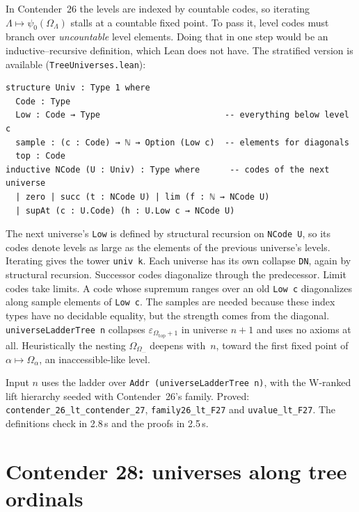 \documentclass[11pt]{article}
\theoremstyle{definition}
\theoremstyle{remark}
\newcommand{\lean}[1]{\texttt{#1}}
\begin{document}
In Contender~26 the levels are indexed by countable codes, so iterating
$\Lambda\mapsto\psi_0(\Omega_\Lambda)$ stalls at a countable fixed point. To
pass it, level codes must branch over \emph{uncountable} level elements. Doing
that in one step would be an inductive--recursive definition, which Lean does
not have. The stratified version is available (\lean{TreeUniverses.lean}):
\begin{lstlisting}
structure Univ : Type 1 where
  Code : Type
  Low : Code → Type                         -- everything below level c
  sample : (c : Code) → ℕ → Option (Low c)  -- elements for diagonals
  top : Code
inductive NCode (U : Univ) : Type where      -- codes of the next universe
  | zero | succ (t : NCode U) | lim (f : ℕ → NCode U)
  | supAt (c : U.Code) (h : U.Low c → NCode U)
\end{lstlisting}
The next universe's \lean{Low} is defined by structural recursion on
\lean{NCode U}, so its codes denote levels as large as the elements of the
previous universe's levels. Iterating gives the tower \lean{univ k}. Each
universe has its own collapse \lean{DN}, again by structural recursion.
Successor codes diagonalize through the predecessor. Limit codes take limits.
A code whose supremum ranges over an old \lean{Low c} diagonalizes along sample
elements of \lean{Low c}. The samples are needed because these index types have
no decidable equality, but the strength comes from the diagonal.
\lean{universeLadderTree n} collapses $\varepsilon_{\Omega_{\mathrm{top}}+1}$ in
universe $n{+}1$ and uses no axioms at all. Heuristically the nesting
$\Omega_{\Omega_{\cdots}}$ deepens with~$n$, toward the first fixed point of
$\alpha\mapsto\Omega_\alpha$, an inaccessible-like level.

Input $n$ uses the ladder over \lean{Addr (universeLadderTree n)}, with the
W-ranked lift hierarchy seeded with Contender~26's family. Proved:
\lean{contender\_26\_lt\_\allowbreak contender\_27}, \lean{family26\_lt\_F27} and
\lean{uvalue\_lt\_F27}. The definitions check in 2.8\,s and the proofs in 2.5\,s.

\section{Contender 28: universes along tree ordinals}
\end{document}
